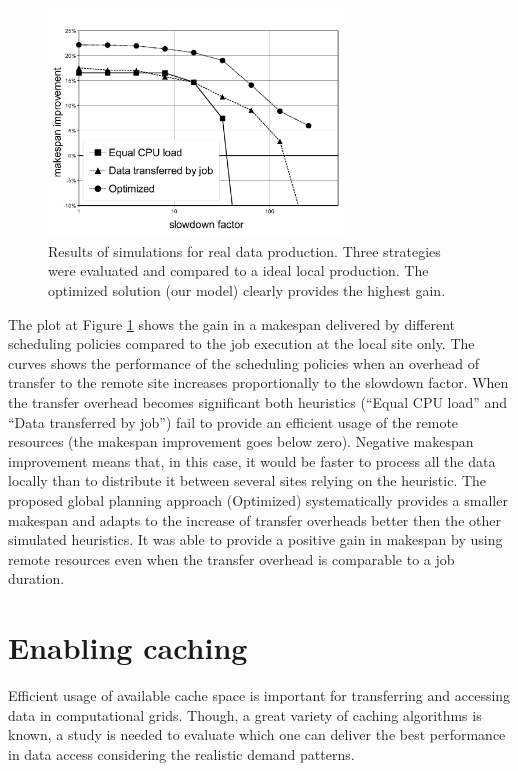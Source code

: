 \documentclass[english]{ddny}
\begin{document}
\begin{figure}[h]
    \centering
    \includegraphics[trim =5mm 5mm 5mm 10mm ,clip,width=0.7\textwidth]{pic/makespan_vs_slowdown4.pdf}
    \caption{Results of simulations for real data production. Three strategies were evaluated and compared to a ideal local production. The
   optimized solution (our model) clearly provides the highest gain.}
    \label{fig:makespan_vs_slowdown}
\end{figure}

The plot at Figure \ref{fig:makespan_vs_slowdown} shows the gain in a makespan delivered by different scheduling policies compared to the job execution at the local site only. The curves shows the performance of the scheduling policies when an overhead of transfer to the remote site increases proportionally to the slowdown factor. When the transfer overhead becomes significant both heuristics (``Equal CPU load'' and ``Data transferred by job'') fail to provide an efficient usage of the remote resources (the makespan improvement goes below zero). Negative makespan improvement means that, in this case, it would be faster to process all the data locally than to distribute it between several sites relying on the heuristic. The proposed global planning approach (Optimized) systematically provides a smaller makespan and adapts to the increase of transfer overheads better then the other simulated  heuristics. It was able to provide a positive gain in makespan by using remote resources even when the transfer overhead is comparable to a job duration.  

\section{Enabling caching}
\label{Cache}
Efficient usage of available cache space is important for transferring and accessing data in computational grids. Though, a great variety of caching algorithms is known, a study is needed to evaluate which one can deliver the best performance in data access considering the realistic demand patterns.
 
\end{document}
